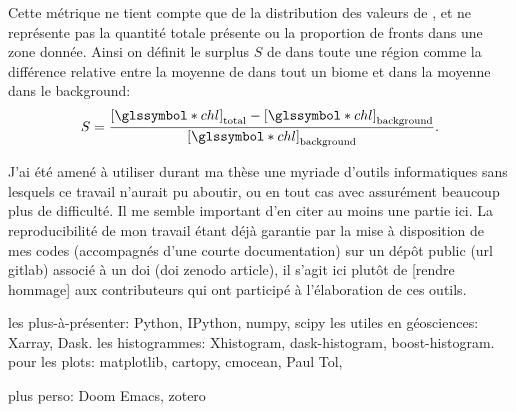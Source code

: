 \documentclass[index]{subfiles}
\begin{document}
Cette métrique ne tient compte que de la distribution des valeurs de , et ne représente pas la quantité totale présente ou la proportion de fronts dans une zone donnée.
Ainsi on définit le surplus \(S\) de  dans toute une région comme la différence relative entre la moyenne de  dans tout un biome et dans la moyenne dans le background:
\begin{equation}
  S = \frac{\moy{\am{chl}}_\tot - \moy{\am{chl}}_\bkg}
  {\moy{\am{chl}}_\bkg} .
\end{equation}

\label{sec:ref-info}

J'ai été amené à utiliser durant ma thèse une myriade d'outils informatiques sans lesquels ce travail n'aurait pu aboutir, ou en tout cas avec assurément beaucoup plus de difficulté.
Il me semble important d'en citer au moins une partie ici.
La reproducibilité de mon travail étant déjà garantie par la mise à disposition de mes codes (accompagnés d'une courte documentation) sur un dépôt public (url gitlab) associé à un doi (doi zenodo article), il s'agit ici plutôt de [rendre hommage] aux contributeurs qui ont participé à l'élaboration de ces outils.

les plus-à-présenter: Python, IPython, numpy, scipy
les utiles en géosciences: Xarray, Dask.
les histogrammes: Xhistogram, dask-histogram, boost-histogram.
pour les plots: matplotlib, cartopy, cmocean, Paul Tol,

plus perso: Doom Emacs, zotero

 {}
\end{document}
